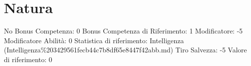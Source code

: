 \section{Natura}\label{natura}

\begin{description}
\tightlist
\item[Tags: ABI]
No Bonus Competenza: 0 Bonus Competenza di Riferimento: 1 Modificatore:
-5 Modificatore Abilità: 0 Statistica di riferimento: Intelligenza
(Intelligenza\%203429561fecb44c7b8df65e8447f42abb.md) Tiro Salvezza: -5
Valore di riferimento: 0
\end{description}
